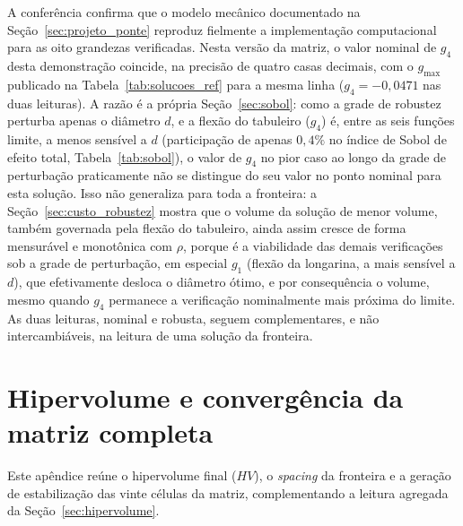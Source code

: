 \begin{appendices}
A conferência confirma que o modelo mecânico documentado na Seção~\ref{sec:projeto_ponte} reproduz fielmente a implementação computacional para as oito grandezas verificadas.
Nesta versão da matriz, o valor nominal de $g_4$ desta demonstração coincide, na precisão de quatro casas decimais, com o $g_{\max}$ publicado na Tabela~\ref{tab:solucoes_ref} para a mesma linha ($g_4 = -0{,}0471$ nas duas leituras).
A razão é a própria Seção~\ref{sec:sobol}: como a grade de robustez perturba apenas o diâmetro $d$, e a flexão do tabuleiro ($g_4$) é, entre as seis funções limite, a menos sensível a $d$ (participação de apenas $0{,}4\%$ no índice de Sobol de efeito total, Tabela~\ref{tab:sobol}), o valor de $g_4$ no pior caso ao longo da grade de perturbação praticamente não se distingue do seu valor no ponto nominal para esta solução.
Isso não generaliza para toda a fronteira: a Seção~\ref{sec:custo_robustez} mostra que o volume da solução de menor volume, também governada pela flexão do tabuleiro, ainda assim cresce de forma mensurável e monotônica com $\rho$, porque é a viabilidade das demais verificações sob a grade de perturbação, em especial $g_1$ (flexão da longarina, a mais sensível a $d$), que efetivamente desloca o diâmetro ótimo, e por consequência o volume, mesmo quando $g_4$ permanece a verificação nominalmente mais próxima do limite.
As duas leituras, nominal e robusta, seguem complementares, e não intercambiáveis, na leitura de uma solução da fronteira.

\section{Hipervolume e convergência da matriz completa}\label{ap:hv}

Este apêndice reúne o hipervolume final ($HV$), o \textit{spacing} da fronteira e a geração de estabilização das vinte células da matriz, complementando a leitura agregada da Seção~\ref{sec:hipervolume}.


\end{appendices}
